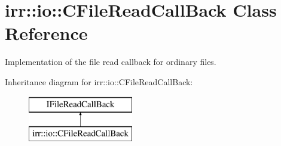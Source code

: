 \hypertarget{classirr_1_1io_1_1_c_file_read_call_back}{\section{irr\-:\-:io\-:\-:C\-File\-Read\-Call\-Back Class Reference}
\label{classirr_1_1io_1_1_c_file_read_call_back}
}


Implementation of the file read callback for ordinary files.  


Inheritance diagram for irr\-:\-:io\-:\-:C\-File\-Read\-Call\-Back\-:\begin{figure}[H]
\begin{center}
\leavevmode
\includegraphics[height=2.000000cm]{classirr_1_1io_1_1_c_file_read_call_back}
\end{center}
\end{figure}
